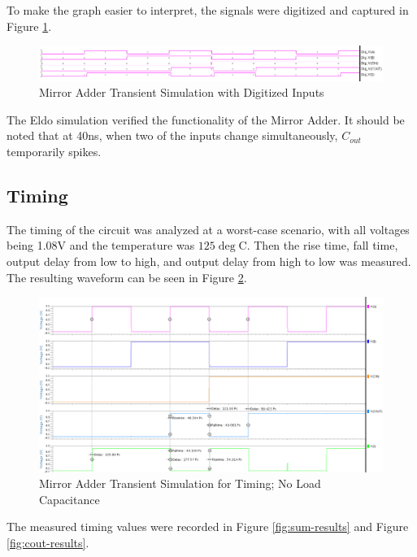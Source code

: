 \documentclass[11pt]{article}
\begin{document}
		To make the graph easier to interpret, the signals were digitized and captured in Figure \ref{fig:mirror-adder-functionality}.
		
		\begin{figure}[H]
			\centering
			\includegraphics[width=0.9\linewidth]{"Pictures/Mirror Adder Functionality"}
			\caption{Mirror Adder Transient Simulation with Digitized Inputs}
			\label{fig:mirror-adder-functionality}
		\end{figure}
	
		The Eldo simulation verified the functionality of the Mirror Adder. It should be noted that at 40ns, when two of the inputs change simultaneously, $C_{out}$ temporarily spikes.
	
	\subsection{Timing}
	
		The timing of the circuit was analyzed at a worst-case scenario, with all voltages being 1.08V and the temperature was $125\deg$C. Then the rise time, fall time, output delay from low to high, and output delay from high to low was measured. The resulting waveform can be seen in Figure \ref{fig:timing-no-cap}.
		
		\begin{figure}[H]
			\centering
			\includegraphics[width=0.9\linewidth]{"Pictures/Timing No Cap"}
			\caption{Mirror Adder Transient Simulation for Timing; No Load Capacitance}
			\label{fig:timing-no-cap}
		\end{figure}
	
		The measured timing values were recorded in Figure \ref{fig:sum-results} and Figure \ref{fig:cout-results}.
		
\end{document}
